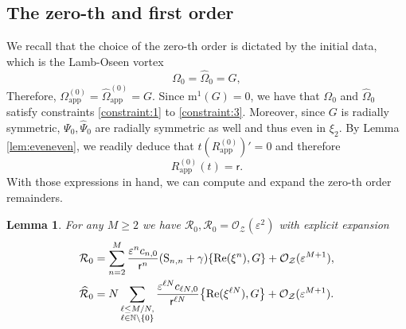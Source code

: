 \documentclass[11pt,reqno,a4paper]{amsart}
\def\eps{\varepsilon}
\def\Re{{\rm Re}}
\newcommand{\cO}{\mathcal{O}}
\newcommand{\cR}{\mathcal{R}}
\newcommand{\cZ}{\mathcal{Z}}
\newcommand{\mrm}{\mathrm{m}}
\newcommand{\1}{\mathbbm{1}}
\newtheorem{lemma}[proposition]{Lemma}
\theoremstyle{definition}
\theoremstyle{definition}
\numberwithin{equation}{section}
\newcommand{\Mapp}[2]{#1^{(#2)}_\mathrm{app}}
\begin{document}
\subsection{The zero-th and first order}\label{sec:first_orders}
We recall that the choice of the zero-th order is dictated by the initial data, which is the Lamb-Oseen vortex
\begin{equation}
    \Omega_0= \widehat{\Omega}_0 = G,
\end{equation}
Therefore, $\Mapp{\Omega}{0} = \Mapp{\widehat{\Omega}}{0} = G$. Since $\mrm^1(G) = 0$, we have that $\Omega_0$ and $\widehat{\Omega}_0$ satisfy constraints \ref{constraint:1} to \ref{constraint:3}. Moreover, since $G$ is radially symmetric, $\Psi_0,\widehat{\Psi}_0$ are radially symmetric as well and thus even in $\xi_2$. By Lemma \ref{lem:eveneven}, we readily deduce that $t(\Mapp{R}{0})'=0$ and therefore 
\[
\Mapp{R}{0}(t)=\mathsf{r}.
\]
With those expressions in hand, we can compute and expand the zero-th order remainders.
\begin{lemma}
\label{lem:R0}
    For any $M\geq 2$ we have $\cR_0,\widehat{\cR}_0=\cO_{\cZ}(\eps^2)$ with explicit expansion
    \begin{align}
\label{eq:RG}\cR_0&=\sum_{n=2}^M\frac{\eps^nc_{n,0}}{\mathsf{r}^n}({\rm S}_{n,n}+\gamma)\{\Re(\xi^n),G\}+\cO_{\cZ}(\eps^{M+1}), \\
\label{eq:JG}\widehat{\cR}_0&=N\sum_{\substack{\ell \leq M/N, \\ \ell \in \mathbb{N}\setminus\{0\}}}\frac{\eps^{\ell N}c_{\ell N,0}}{\mathsf{r}^{\ell N}}\big\{\Re(\xi^{\ell N}),G\big\}+\cO_{\cZ}(\eps^{M+1}).
    \end{align}
\end{lemma}
\end{document}

